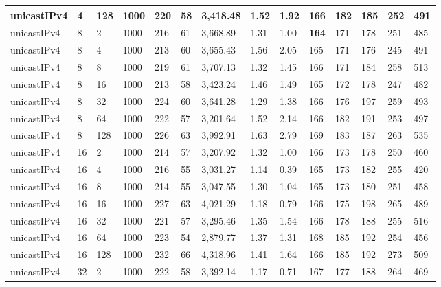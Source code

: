 \begin{table}[!htb]
\begin{tabular}{@{}llllllllllllll@{}}
unicastIPv4 & 4            & 128   & 1000 & 220  & 58  & 3,418.48 & 1.52     & 1.92     & 166 & 182 & 185 & 252 & 491  \\ \hline
unicastIPv4 & 8            & 2     & 1000 & 216  & 61  & 3,668.89 & 1.31     & 1.00     & \textbf{164} & 171 & 178 & 251 & 485  \\
unicastIPv4 & 8            & 4     & 1000 & 213  & 60  & 3,655.43 & 1.56     & 2.05     & 165 & 171 & 176 & 245 & 491  \\
unicastIPv4 & 8            & 8     & 1000 & 219  & 61  & 3,707.13 & 1.32     & 1.45     & 166 & 171 & 184 & 258 & 513  \\
unicastIPv4 & 8            & 16    & 1000 & 213  & 58  & 3,423.24 & 1.46     & 1.49     & 165 & 172 & 178 & 247 & 482  \\
unicastIPv4 & 8            & 32    & 1000 & 224  & 60  & 3,641.28 & 1.29     & 1.38     & 166 & 176 & 197 & 259 & 493  \\
unicastIPv4 & 8            & 64    & 1000 & 222  & 57  & 3,201.64 & 1.52     & 2.14     & 166 & 182 & 191 & 253 & 497  \\
unicastIPv4 & 8            & 128   & 1000 & 226  & 63  & 3,992.91 & 1.63     & 2.79     & 169 & 183 & 187 & 263 & 535  \\ \hline
unicastIPv4 & 16           & 2     & 1000 & 214  & 57  & 3,207.92 & 1.32     & 1.00     & 166 & 173 & 178 & 250 & 460  \\
unicastIPv4 & 16           & 4     & 1000 & 216  & 55  & 3,031.27 & 1.14     & 0.39     & 165 & 173 & 182 & 255 & 420  \\
unicastIPv4 & 16           & 8     & 1000 & 214  & 55  & 3,047.55 & 1.30     & 1.04     & 165 & 173 & 180 & 251 & 458  \\
unicastIPv4 & 16           & 16    & 1000 & 227  & 63  & 4,021.29 & 1.18     & 0.79     & 166 & 175 & 198 & 265 & 489  \\
unicastIPv4 & 16           & 32    & 1000 & 221  & 57  & 3,295.46 & 1.35     & 1.54     & 166 & 178 & 188 & 255 & 516  \\
unicastIPv4 & 16           & 64    & 1000 & 223  & 54  & 2,879.77 & 1.37     & 1.31     & 168 & 185 & 192 & 254 & 456  \\
unicastIPv4 & 16           & 128   & 1000 & 232  & 66  & 4,318.96 & 1.41     & 1.64     & 166 & 185 & 192 & 273 & 509  \\ \hline
unicastIPv4 & 32           & 2     & 1000 & 222  & 58  & 3,392.14 & 1.17     & 0.71     & 167 & 177 & 188 & 264 & 469  \\

\end{tabular}
\end{table}
